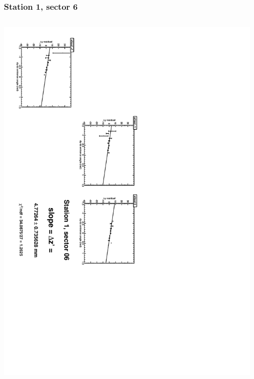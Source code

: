 \documentclass[compress]{beamer}
\begin{document}
\begin{frame}
\frametitle{Station 1, sector 6}
\begin{columns}
\includegraphics[height=\linewidth, angle=90]{zfits/zfit_1_06.pdf}


\end{columns}
\end{frame}
\end{document}
